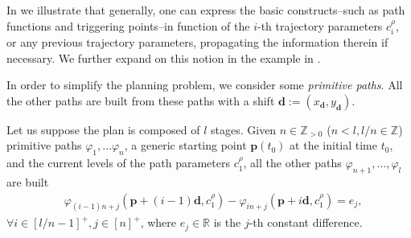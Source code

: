 In  we illustrate that generally, one can express the basic constructs--such as path functions and triggering points--in function of the $i$-th trajectory parameters $c_{i}^{\rho}$, or any previous trajectory parameters, propagating the information therein if necessary. We further expand on this notion in the example in . 

In order to simplify the planning problem, we consider some \emph{primitive paths}. All the other paths are built from these paths with a shift $\mathbf{d}:=(x_{\mathbf{d}},y_{\mathbf{d}})$. 

Let us suppose the plan is composed of $l$ stages. Given $n\in\mathbb{Z}_{>0}$ ($n<l,l/n\in\mathbb{Z}$) primitive paths $\varphi_1,\dots\varphi_n$, a generic starting point $\mathbf{p}(t_0)$ at the initial time $t_0$, and the current levels of the path parameters $c_1^\rho$, all the other paths $\varphi_{n+1},\dots,\varphi_l$ are built
\begin{equation}\label{eq:primitive}\begin{split}
  &\varphi_{(i-1)n+j}(\mathbf{p}+(i-1)\mathbf{d},c_1^\rho)-\varphi_{in+j}(\mathbf{p}+i\mathbf{d},c_1^\rho)=e_j,
\end{split}\end{equation}
$\forall i\in[l/n-1]^+,j\in[n]^+$, where $e_j\in\mathbb{R}$ is the $j$-th constant difference.

